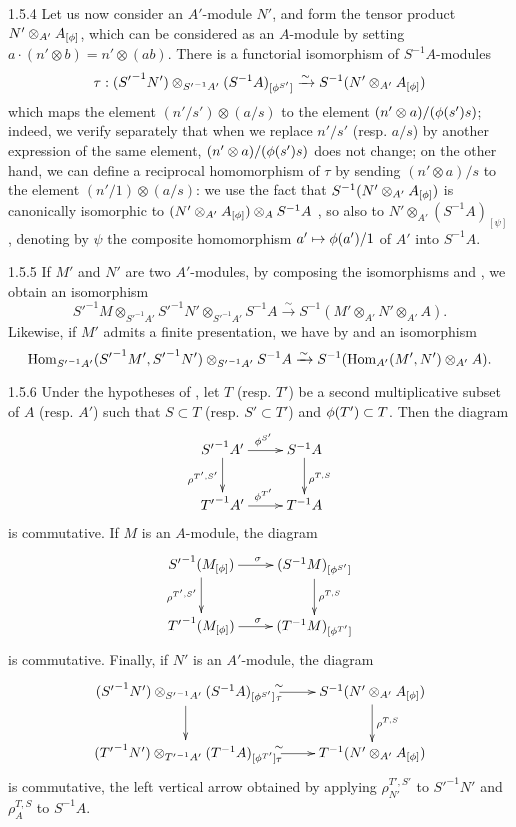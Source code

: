 \documentclass[10pt,oneside]{book}
\begin{document}
\begin{env}{1.5.4}
\label{env-0.1.5.4}
Let us now consider an $A'$-module $N'$, and form the tensor product
$N'\otimes_{A'}A_{[\phi]}$, which can be considered as an $A$-module by setting
$a\cdot(n'\otimes b)=n'\otimes(ab)$. There is a functorial isomorphism of $S^{-1}A$-modules
\[
  \tau:({S'}^{-1}N')\otimes_{{S'}^{-1}A'}(S^{-1}A)_{[\phi^{S'}]}
  \xrightarrow{\sim}S^{-1}(N'\otimes_{A'}A_{[\phi]})
\]
which maps the element $(n'/s')\otimes(a/s)$ to the element $(n'\otimes a)/(\phi(s')s)$;
indeed, we verify separately that when we replace $n'/s'$ (resp. $a/s$) by another expression
of the same element, $(n'\otimes a)/(\phi(s')s)$ does not change; on the other hand, we can
define a reciprocal homomorphism of $\tau$ by sending $(n'\otimes a)/s$ to the element
$(n'/1)\otimes(a/s)$: we use the fact that $S^{-1}(N'\otimes_{A'}A_{[\phi]})$ is canonically
isomorphic to $(N'\otimes_{A'}A_{[\phi]})\otimes_A S^{-1}A$ , so also to
$N'\otimes_{A'}(S^{-1}A)_{[\psi]}$, denoting by $\psi$ the composite homomorphism
$a'\mapsto\phi(a')/1$ of $A'$ into $S^{-1}A$.
\end{env}

\begin{env}{1.5.5}
\label{env-0.1.5.5}
If $M'$ and $N'$ are two $A'$-modules, by composing the isomorphisms  and
, we obtain an isomorphism
\[
  {S'}^{-1}M\otimes_{{S'}^{-1}A'}{S'}^{-1}N'\otimes_{{S'}^{-1}A'}S^{-1}A
  \xrightarrow{\sim}S^{-1}(M'\otimes_{A'}N'\otimes_{A'}A).
\]
Likewise, if $M'$ admits a finite presentation, we have by  and
 an isomorphism
\[
  {\mathop{\mathrm{Hom}}\nolimits}_{{S'}^{-1}A'}({S'}^{-1}M',{S'}^{-1}N')\otimes_{{S'}^{-1}A'}S^{-1}A
  \xrightarrow{\sim}S^{-1}({\mathop{\mathrm{Hom}}\nolimits}_{A'}(M',N')\otimes_{A'}A).
\]
\end{env}

\begin{env}{1.5.6}
\label{env-0.1.5.6}
Under the hypotheses of , let $T$ (resp. $T'$) be a second multiplicative
subset of $A$ (resp. $A'$) such that $S\subset T$ (resp. $S'\subset T'$) and
$\phi(T')\subset T$. Then the diagram
\[
  \xymatrix{
    {S'}^{-1}A'\ar[r]^{\vphi^{S'}}\ar[d]_{\rho^{T',S'}} & S^{-1}A\ar[d]^{\rho^{T,S}}\\
    {T'}^{-1}A'\ar[r]^{\vphi^{T'}} & T^{-1}A
  }
\]
is commutative. If $M$ is an $A$-module, the diagram
\[
  \xymatrix{
    {S'}^{-1}(M_{[\vphi]})\ar[r]^\sigma\ar[d]_{\rho^{T',S'}} &
    (S^{-1}M)_{[\vphi^{S'}]}\ar[d]^{\rho^{T,S}}\\
    {T'}^{-1}(M_{[\vphi]})\ar[r]^\sigma & (T^{-1}M)_{[\vphi^{T'}]}
  }
\]
is commutative. Finally, if $N'$ is an $A'$-module, the diagram
\[
  \xymatrix{
    ({S'}^{-1}N')\otimes_{{S'}^{-1}A'}(S^{-1}A)_{[\vphi^{S'}]}\ar[r]^\sim_\tau\ar[d] &
    S^{-1}(N'\otimes_{A'}A_{[\vphi]})\ar[d]^{\rho^{T,S}}\\
    ({T'}^{-1}N')\otimes_{{T'}^{-1}A'}(T^{-1}A)_{[\vphi^{T'}]}
    \ar[r]^\sim_\tau & T^{-1}(N'\otimes_{A'}A_{[\vphi]})
  }
\]
is commutative, the left vertical arrow obtained by applying
$\rho_{N'}^{T',S'}$ to ${S'}^{-1}N'$ and $\rho_A^{T,S}$ to $S^{-1}A$.
\end{env}
\end{document}
